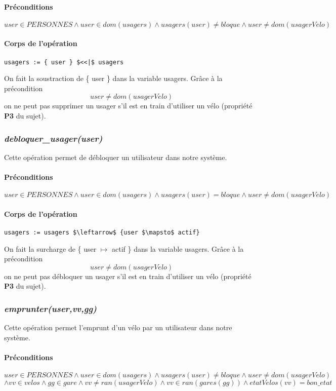 \documentclass[12pt]{article}
\begin{document}
\paragraph{Préconditions}
\[user \in PERSONNES \land user \in dom(usagers) \land usagers(user) \neq bloque \land user \neq dom(usagerVelo) \]

\paragraph{Corps de l'opération}
\textbf{}
\begin{lstlisting}[mathescape]
  usagers := { user } $<<|$ usagers
\end{lstlisting}

On fait la soustraction de \{ user \} dans la variable usagers. Grâce à la précondition \[ user \neq dom(usagerVelo) \] on ne peut pas supprimer un usager s'il est en train d'utiliser un vélo (propriété \textbf{P3} du sujet).

\subsubsection{\textit{debloquer\_usager(user)}}
Cette opération permet de débloquer un utilisateur dans notre système.
\paragraph{Préconditions}
\[ user \in PERSONNES \land user \in dom(usagers) \land usagers(user) = bloque \land user \neq dom(usagerVelo) \]

\paragraph{Corps de l'opération}
\textbf{}
\begin{lstlisting}[mathescape]
  usagers := usagers $\leftarrow$ {user $\mapsto$ actif}
\end{lstlisting}
On fait la surcharge de \{ user $\mapsto$ actif \} dans la variable usagers. Grâce à la précondition \[ user \neq dom(usagerVelo) \] on ne peut pas débloquer un usager s'il est en train d'utiliser un vélo (propriété \textbf{P3} du sujet).
\subsubsection{\textit{emprunter(user,vv,gg)}}
Cette opération permet l'emprunt d'un vélo par un utilisateur dans notre système.
\paragraph{Préconditions}
\[ user \in PERSONNES \land user \in dom(usagers) \land usagers(user) \neq bloque \land user \neq dom(usagerVelo) \]\[\land vv \in velos \land gg \in gare \land vv \neq ran(usagerVelo) \land vv \in ran(gares(gg)) \land etatVelos(vv) = bon\_etat\]
\end{document}
